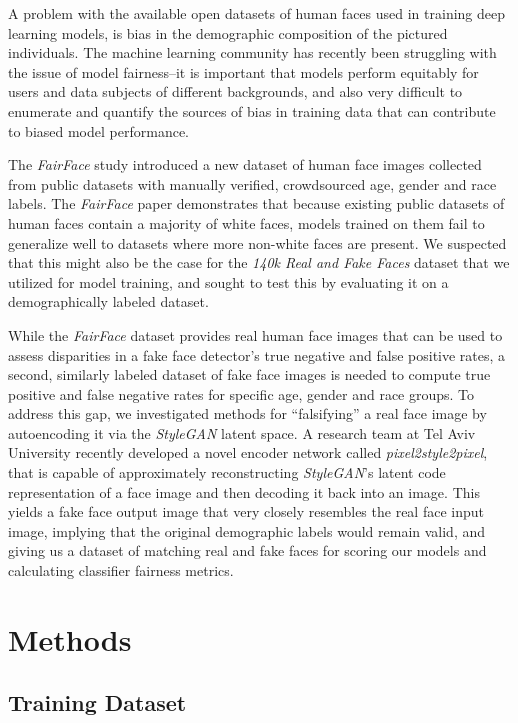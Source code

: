 \documentclass[11pt, letterpaper]{article}
\begin{document}
\begin{multicols}{2}
  A problem with the available open datasets of human faces used in
  training deep learning models, is bias in the demographic
  composition of the pictured individuals. The machine learning
  community has recently been struggling with the issue of model
  fairness--it is important that models perform equitably for users
  and data subjects of different backgrounds, and also very difficult
  to enumerate and quantify the sources of bias in training data that
  can contribute to biased model performance.

  The \emph{FairFace}\cite{karkkainen2019fairface} study introduced a new
  dataset of human face images collected from public datasets with
  manually verified, crowdsourced age, gender and race labels. The
  \emph{FairFace} paper demonstrates that because existing public datasets of
  human faces contain a majority of white faces, models trained on
  them fail to generalize well to datasets where more non-white faces
  are present. We suspected that this might also be the case for the
  \emph{140k Real and Fake Faces} dataset that we utilized for model
  training, and sought to test this by evaluating it on a
  demographically labeled dataset.

  While the \emph{FairFace} dataset provides real human face images that can
  be used to assess disparities in a fake face detector's true
  negative and false positive rates, a second, similarly labeled
  dataset of fake face images is needed to compute true positive and
  false negative rates for specific age, gender and race groups. To
  address this gap, we investigated methods for ``falsifying'' a real
  face image by autoencoding it via the \emph{StyleGAN} latent space. A
  research team at Tel Aviv University recently developed a novel
  encoder network\cite{richardson2020encoding} called
  \emph{pixel2style2pixel}, that is capable of approximately
  reconstructing \emph{StyleGAN}'s latent code representation of a face image
  and then decoding it back into an image. This yields a fake face
  output image that very closely resembles the real face input image,
  implying that the original demographic labels would remain valid,
  and giving us a dataset of matching real and fake faces for
  scoring our models and calculating classifier fairness metrics.

  \section{Methods}

  \subsection{Training Dataset}


\end{multicols}
\end{document}

